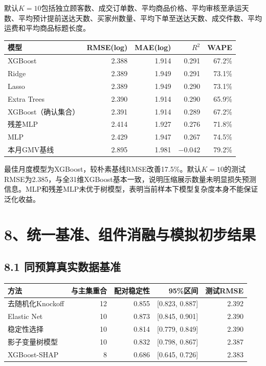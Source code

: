 \documentclass[UTF8,12pt,a4paper]{ctexart}
\begin{document}
默认$K=10$包括独立顾客数、成交订单数、平均商品价格、平均审核至承运天数、平均预计提前送达天数、买家州数量、平均下单至送达天数、成交件数、平均运费和平均商品标题长度。

\begin{center}
\scriptsize
\renewcommand{\arraystretch}{1.12}
\begin{tabular}{lrrrr}
\toprule
模型 & RMSE(log) & MAE(log) & $R^2$ & WAPE\\
\midrule
XGBoost & 2.388 & 1.914 & 0.291 & 67.2\%\\
Ridge & 2.389 & 1.949 & 0.291 & 73.1\%\\
Lasso & 2.389 & 1.949 & 0.290 & 73.1\%\\
Extra Trees & 2.390 & 1.914 & 0.290 & 65.9\%\\
XGBoost（确认集合） & 2.391 & 1.914 & 0.289 & 67.2\%\\
残差MLP & 2.414 & 1.927 & 0.276 & 71.8\%\\
MLP & 2.429 & 1.947 & 0.267 & 74.5\%\\
本月GMV基线 & 2.895 & 1.981 & $-0.042$ & 79.2\%\\
\bottomrule
\end{tabular}
\end{center}

最佳月度模型为XGBoost，较朴素基线RMSE改善17.5\%。默认$K=10$的测试RMSE为2.385，与全31维XGBoost基本一致，说明压缩展示数量未明显损失预测信息。MLP和残差MLP未优于树模型，表明当前样本下模型复杂度本身不能保证泛化收益。

\newpage
\section*{8、统一基准、组件消融与模拟初步结果}

\subsection*{8.1 同预算真实数据基准}

\begin{center}
\scriptsize
\renewcommand{\arraystretch}{1.14}
\begin{tabular}{lrrrr}
\toprule
方法 & 与主集重合 & 配对稳定性 & 95\%区间 & 测试RMSE\\
\midrule
去随机化Knockoff & 12 & 0.855 & [0.823, 0.887] & 2.392\\
Elastic Net & 10 & 0.873 & [0.845, 0.901] & 2.390\\
稳定性选择 & 10 & 0.814 & [0.779, 0.849] & 2.390\\
影子变量树模型 & 10 & 0.832 & [0.798, 0.867] & 2.387\\
XGBoost-SHAP & 8 & 0.686 & [0.645, 0.726] & 2.383\\
\bottomrule
\end{tabular}
\end{center}
\end{document}
